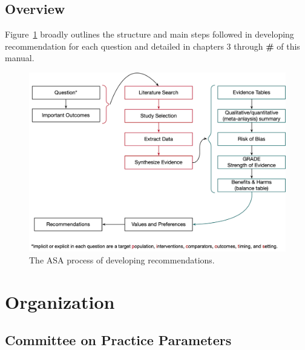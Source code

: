 \documentclass[
  letterpaper,
  DIV=11,
  numbers=noendperiod]{scrreprt}
\begin{document}
\hypertarget{overview}{%
\section{Overview}\label{overview}}

Figure~\ref{fig-overview} broadly outlines the structure and main steps
followed in developing recommendation for each question and detailed in
chapters 3 through \textbf{\#} of this manual.

\begin{figure}

\caption{\label{fig-overview}The ASA process of developing
recommendations.}

{\centering \includegraphics[width=6.25in,height=\textheight]{assets/overview.png}

}

\end{figure}


\hypertarget{organization}{%
\chapter{Organization}\label{organization}}

\hypertarget{committee-on-practice-parameters}{%
\section{Committee on Practice
Parameters}\label{committee-on-practice-parameters}}
\end{document}
